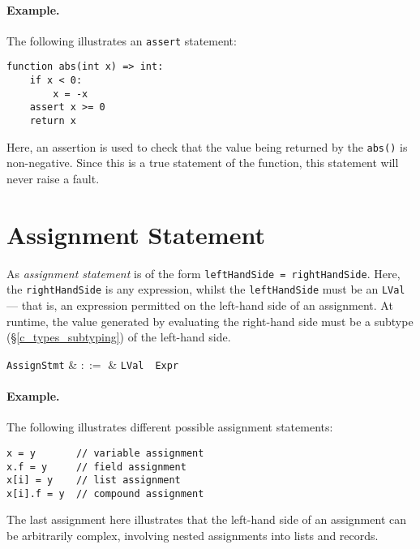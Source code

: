 \paragraph{Example.} The following illustrates an \lstinline{assert} statement:
\begin{lstlisting}
function abs(int x) => int:
    if x < 0:
        x = -x
    assert x >= 0
    return x
\end{lstlisting}
Here, an assertion is used to check that the value being returned by the \lstinline{abs()} is non-negative.  Since this is a true statement of the function, this statement will never raise a fault.


\section{Assignment Statement}

As {\em assignment statement} is of the form \lstinline{leftHandSide = rightHandSide}.  Here, the \lstinline{rightHandSide} is any expression, whilst the \lstinline{leftHandSide} must be an \lstinline{LVal} --- that is, an expression permitted on the left-hand side of an assignment.  At runtime, the value generated by evaluating the right-hand side must be a subtype (\S\ref{c_types_subtyping}) of the left-hand side.

\begin{syntax}
  \verb+AssignStmt+ & $::=$ & \verb+LVal+\ \token{=}\ \verb+Expr+\\
\end{syntax}


\paragraph{Example.} The following illustrates different possible assignment statements:
\begin{lstlisting}
x = y       // variable assignment
x.f = y     // field assignment
x[i] = y    // list assignment
x[i].f = y  // compound assignment
\end{lstlisting}
The last assignment here illustrates that the left-hand side of an assignment can be arbitrarily complex, involving nested assignments into lists and records.


